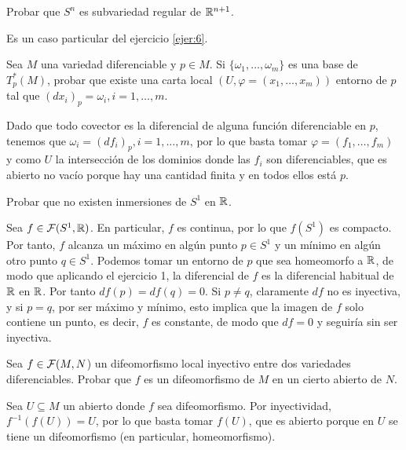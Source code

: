\documentclass[twoside]{article}
\newcounter{ejercicio}
\begin{document}
\newpage

\begin{ejercicio}{8}
Probar que $S^n$ es subvariedad regular de $\mathbb{R}^{n+1}$.
\end{ejercicio}
\begin{solucion}
Es un caso particular del ejercicio \ref{ejer:6}.
\end{solucion}

\newpage

\begin{ejercicio}{9}
Sea $M$ una variedad diferenciable y $p\in M$. Si $\{\omega_1,\dots,\omega_m\}$ es una base de
$T^*_p (M)$, probar que existe una carta local $(U, \varphi = (x_1, \dots, x_m))$ entorno de
$p$ tal que $(dx_i)_p = \omega_i, i = 1, \dots,m$.
\end{ejercicio}
\begin{solucion}
Dado que todo covector es la diferencial de alguna función diferenciable en $p$, tenemos que $\omega_i=(df_i)_p, i=1,\dots, m$, por lo que basta tomar $\varphi=(f_1,\dots,f_m)$ y como $U$ la intersección de los dominios donde las $f_i$ son diferenciables, que es abierto no vacío porque hay una cantidad finita y en todos ellos está $p$.
\end{solucion}

\newpage

\begin{ejercicio}{10}
Probar que no existen inmersiones de $S^1$ en $\mathbb{R}$.
\end{ejercicio}
\begin{solucion}
Sea $f\in\mathcal{F}(S^1,\mathbb{R})$. En particular, $f$ es continua, por lo que $f(S^1)$ es compacto. Por tanto, $f$ alcanza un máximo en algún punto $p\in S^1$ y un mínimo en algún otro punto $q\in S^1$. Podemos tomar un entorno de $p$ que sea homeomorfo a $\mathbb{R}$, de modo que aplicando el ejercicio 1, la diferencial de $f$ es la diferencial habitual de $\mathbb{R}$ en $\mathbb{R}$. Por tanto $df(p)=df(q)=0$. Si $p\neq q$, claramente $df$ no es inyectiva, y si $p=q$, por ser máximo y mínimo, esto implica que la imagen de $f$ solo contiene un punto, es decir, $f$ es constante, de modo que $df=0$ y seguiría sin ser inyectiva.
\end{solucion}

\newpage

\begin{ejercicio}{11}
Sea $f \in \mathcal{F}(M,N$) un difeomorfismo local inyectivo entre dos variedades
diferenciables. Probar que $f$ es un difeomorfismo de $M$ en un cierto abierto
de $N$.
\end{ejercicio}
\begin{solucion}
Sea $U\subseteq M$ un abierto donde $f$ sea difeomorfismo. Por inyectividad, $f^{-1}(f(U))=U$, por lo que basta tomar $f(U)$, que es abierto porque en $U$ se tiene un difeomorfismo (en particular, homeomorfismo). 
\end{solucion}
\end{document}
